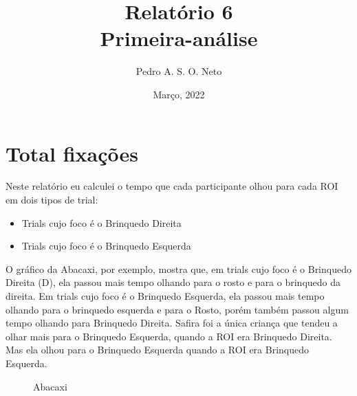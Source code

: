 \documentclass{article}
\title{Relatório 6 \\ Primeira-análise}
\author{Pedro A. S. O. Neto}
\date{Março, 2022}
\begin{document}
\maketitle

\section{Total fixações}

Neste relatório eu calculei o tempo que cada participante olhou para cada ROI em dois tipos de trial: 

\begin{itemize}
  \item Trials cujo foco é o Brinquedo Direita
  \item Trials cujo foco é o Brinquedo Esquerda
\end{itemize}

O gráfico da Abacaxi, por exemplo, mostra que, em trials cujo foco é o Brinquedo Direita (D), ela passou mais tempo olhando para o rosto e para o brinquedo da direita. Em trials cujo foco é o Brinquedo Esquerda, ela passou mais tempo olhando para o brinquedo esquerda e para o Rosto, porém também passou algum tempo olhando para Brinquedo Direita.
Safira foi a única criança que tendeu a olhar mais para o Brinquedo Esquerda, quando a ROI era Brinquedo Direita. Mas ela olhou para o Brinquedo Esquerda quando a ROI era Brinquedo Esquerda.

\begin{figure}[t]
\caption{Abacaxi}
\noindent{}
\centering
\end{figure}
\end{document}
